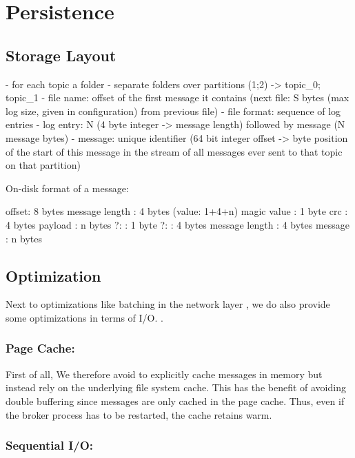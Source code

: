 \section{Persistence}

\subsection{Storage Layout}

- for each topic a folder
- separate folders over partitions (1;2) -> topic\_0; topic\_1
- file name: offset of the first message it contains (next file: S bytes (max log size, given in configuration) from previous file)
- file format: sequence of log entries
- log entry: N (4 byte integer -> message length) followed by message (N message bytes)
- message: unique identifier (64 bit integer offset -> byte position of the start of this message in the stream of all messages ever sent to that topic on that partition)

On-disk format of a message:

offset: 8 bytes
message length : 4 bytes (value: 1+4+n) 
magic value  : 1 byte
crc            : 4 bytes
payload        : n bytes
    ?:              : 1 byte
    ?:              : 4 bytes
    message length  : 4 bytes
    message         : n bytes

\subsection{Optimization}

Next to optimizations like batching in the network layer ,
we do also provide some optimizations in terms of I/O. .

\subsubsection{Page Cache:}

First of all, We therefore avoid to explicitly cache messages in memory but
instead rely on the underlying file system cache. This has the benefit of
avoiding double buffering since messages are only cached in the page cache.
Thus, even if the broker process has to be restarted, the cache retains warm.


\subsubsection{Sequential I/O: }

